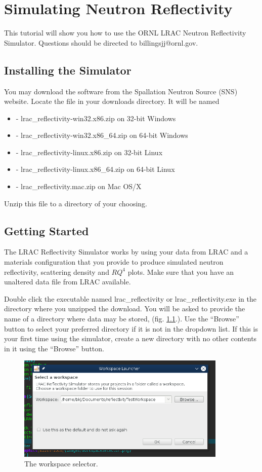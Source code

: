 \chapter{Simulating Neutron Reflectivity}

This tutorial will show you how to use the ORNL LRAC Neutron Reflectivity
Simulator. Questions should be directed to billingsjj@ornl.gov.

\section{Installing the Simulator}

You may download the software from the Spallation Neutron Source (SNS) website.
Locate the file in your downloads directory. It will be named
\begin{itemize}
  \item - lrac\_reflectivity-win32.x86.zip on 32-bit Windows
  \item - lrac\_reflectivity-win32.x86\_64.zip on 64-bit Windows
  \item - lrac\_reflectivity-linux.x86.zip on 32-bit Linux
  \item - lrac\_reflectivity-linux.x86\_64.zip on 64-bit Linux
  \item - lrac\_reflectivity.mac.zip on Mac OS/X
\end{itemize}

Unzip this file to a directory of your choosing. 

\section{Getting Started}
\label{gettingStarted}

The LRAC Reflectivity Simulator works by using your data from LRAC and a
materials configuration that you provide to produce simulated
neutron reflectivity, scattering density and $RQ^4$ plots. Make sure that you
have an unaltered data file from LRAC available.

Double click the executable named lrac\_reflectivity or lrac\_reflectivity.exe
in the directory where you unzipped the download. You will be asked to provide
the name of a directory where data may be stored, (fig. \ref{workspace}.). Use the
``Browse'' button to select your preferred directory if it is not in the dropdown list. If
this is your first time using the simulator, create a new directory with no
other contents in it using the ``Browse'' button.

\begin{figure}[!h]
\centering
\includegraphics[width=10cm]{images/workspaceSelector.png}
\caption{The workspace selector.}
\label{workspace}
\end{figure}

